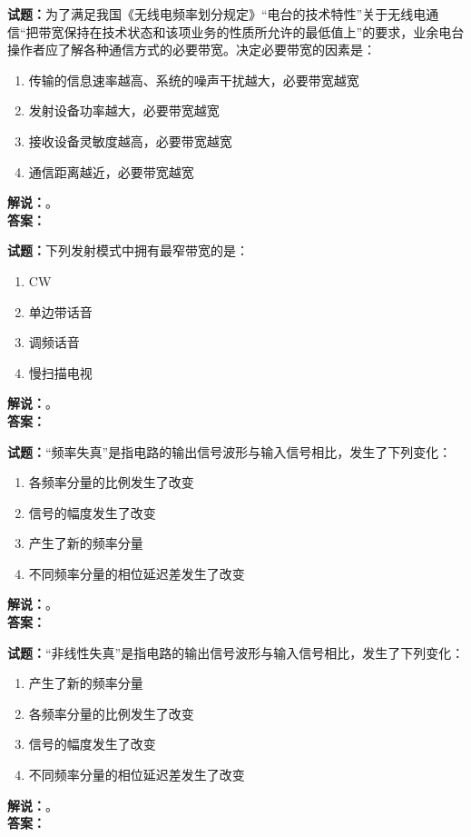\documentclass{ctexbook}
\begin{document}
\bigskip




\noindent\textbf{试题：}为了满足我国《无线电频率划分规定》“电台的技术特性”关于无线电通信“把带宽保持在技术状态和该项业务的性质所允许的最低值上”的要求，业余电台操作者应了解各种通信方式的必要带宽。决定必要带宽的因素是：
\begin{enumerate}[leftmargin=3em]
\item  传输的信息速率越高、系统的噪声干扰越大，必要带宽越宽
\item  发射设备功率越大，必要带宽越宽
\item  接收设备灵敏度越高，必要带宽越宽
\item  通信距离越近，必要带宽越宽
\end{enumerate}
\noindent\textbf{解说：}\textbf{}。\\\noindent\textbf{答案：}

\bigskip




\noindent\textbf{试题：}下列发射模式中拥有最窄带宽的是：
\begin{enumerate}[leftmargin=3em]
\item CW
\item 单边带话音
\item 调频话音
\item 慢扫描电视
\end{enumerate}
\noindent\textbf{解说：}\textbf{}。\\\noindent\textbf{答案：}

\bigskip




\noindent\textbf{试题：}“频率失真”是指电路的输出信号波形与输入信号相比，发生了下列变化：
\begin{enumerate}[leftmargin=3em]
\item 各频率分量的比例发生了改变
\item 信号的幅度发生了改变
\item 产生了新的频率分量
\item 不同频率分量的相位延迟差发生了改变
\end{enumerate}
\noindent\textbf{解说：}\textbf{}。\\\noindent\textbf{答案：}

\bigskip




\noindent\textbf{试题：}“非线性失真”是指电路的输出信号波形与输入信号相比，发生了下列变化：
\begin{enumerate}[leftmargin=3em]
\item 产生了新的频率分量
\item 各频率分量的比例发生了改变
\item 信号的幅度发生了改变
\item 不同频率分量的相位延迟差发生了改变
\end{enumerate}
\noindent\textbf{解说：}\textbf{}。\\\noindent\textbf{答案：}
\end{document}
